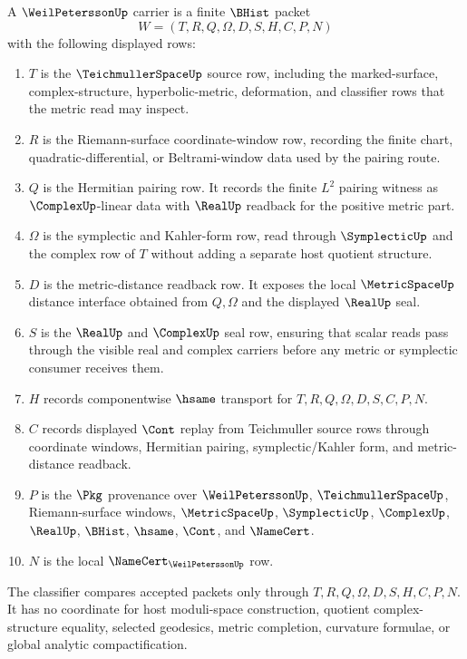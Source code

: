 \begin{definition}
\label{def:weil-petersson-carrier}
A $\WeilPeterssonUp$ carrier is a finite $\BHist$ packet
$$
W=(T,R,Q,\Omega,D,S,H,C,P,N)
$$
with the following displayed rows:
\begin{enumerate}
\item $T$ is the $\TeichmullerSpaceUp$ source row, including the marked-surface, complex-structure, hyperbolic-metric, deformation, and classifier rows that the metric read may inspect.
\item $R$ is the Riemann-surface coordinate-window row, recording the finite chart, quadratic-differential, or Beltrami-window data used by the pairing route.
\item $Q$ is the Hermitian pairing row. It records the finite $L^2$ pairing witness as $\ComplexUp$-linear data with $\RealUp$ readback for the positive metric part.
\item $\Omega$ is the symplectic and Kahler-form row, read through $\SymplecticUp$ and the complex row of $T$ without adding a separate host quotient structure.
\item $D$ is the metric-distance readback row. It exposes the local $\MetricSpaceUp$ distance interface obtained from $Q,\Omega$ and the displayed $\RealUp$ seal.
\item $S$ is the $\RealUp$ and $\ComplexUp$ seal row, ensuring that scalar reads pass through the visible real and complex carriers before any metric or symplectic consumer receives them.
\item $H$ records componentwise $\hsame$ transport for $T,R,Q,\Omega,D,S,C,P,N$.
\item $C$ records displayed $\Cont$ replay from Teichmuller source rows through coordinate windows, Hermitian pairing, symplectic/Kahler form, and metric-distance readback.
\item $P$ is the $\Pkg$ provenance over $\WeilPeterssonUp$, $\TeichmullerSpaceUp$, Riemann-surface windows, $\MetricSpaceUp$, $\SymplecticUp$, $\ComplexUp$, $\RealUp$, $\BHist$, $\hsame$, $\Cont$, and $\NameCert$.
\item $N$ is the local $\NameCert_{\WeilPeterssonUp}$ row.
\end{enumerate}
The classifier compares accepted packets only through $T,R,Q,\Omega,D,S,H,C,P,N$. It has no coordinate for host moduli-space construction, quotient complex-structure equality, selected geodesics, metric completion, curvature formulae, or global analytic compactification.
\end{definition}

